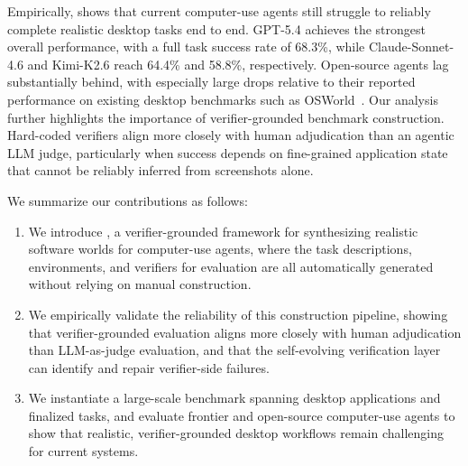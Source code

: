 Empirically, \ours shows that current computer-use agents still struggle to reliably complete realistic desktop tasks end to end. GPT-5.4 achieves the strongest overall performance, with a full task success rate of 68.3\%, while Claude-Sonnet-4.6 and Kimi-K2.6 reach 64.4\% and 58.8\%, respectively. Open-source agents lag substantially behind, with especially large drops relative to their reported performance on existing desktop benchmarks such as OSWorld~\cite{xie2024osworld}. Our analysis further highlights the importance of verifier-grounded benchmark construction. Hard-coded verifiers align more closely with human adjudication than an agentic LLM judge, particularly when success depends on fine-grained application state that cannot be reliably inferred from screenshots alone.

We summarize our contributions as follows:
\begin{enumerate}[leftmargin=*, itemsep=2pt]
    \item We introduce \ours, a verifier-grounded framework for synthesizing realistic software worlds for computer-use agents, where the task descriptions, environments, and verifiers for evaluation are all automatically generated without relying on manual construction.
    
    \item We empirically validate the reliability of this construction pipeline, showing that verifier-grounded evaluation aligns more closely with human adjudication than LLM-as-judge evaluation, and that the self-evolving verification layer can identify and repair verifier-side failures.

    \item We instantiate a large-scale benchmark spanning \napp desktop applications and \nexample finalized tasks, and evaluate frontier and open-source computer-use agents to show that realistic, verifier-grounded desktop workflows remain challenging for current systems.
\end{enumerate}
